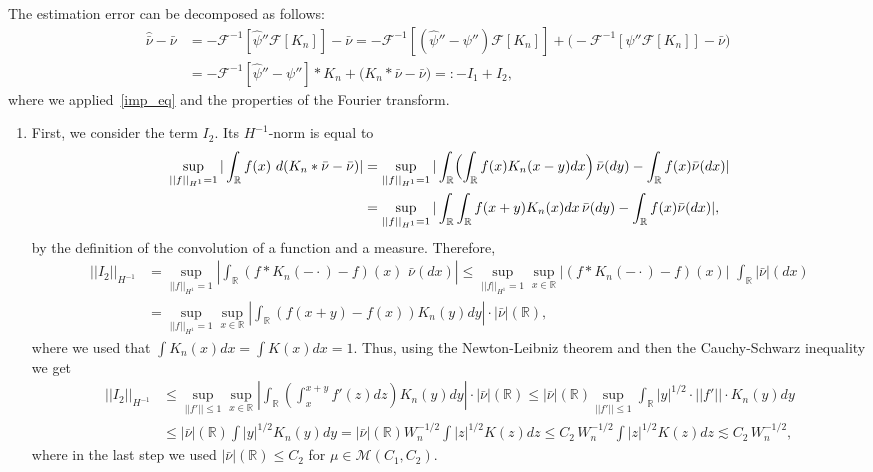 \documentclass[numbers,webpdf,imaiai]{ima-authoring-template}%
\theoremstyle{thmstyletwo}%
\newcommand{\R}{\mathbb{R}}
\newcommand{\F}{\mathcal{F}}
\numberwithin{equation}{section}
\begin{document}
The estimation error can be decomposed as follows: \begin{align*}
    \widehat{\bar{\nu}} - \bar{\nu} &= -\F^{-1}[\widehat{\psi}''\F[K_n]] - \bar{\nu} = -\F^{-1}[(\widehat{\psi}'' - \psi'')\F[K_n]] + \bigl( - \F^{-1}[\psi''\F[K_n]]   - \bar{\nu} \bigr)\\
        &= -\F^{-1}[\widehat{\psi}'' - \psi''] * K_n + \bigl(  K_n * \bar{\nu}   - \bar{\nu} \bigr)=: -I_1+ I_2,
\end{align*}
where we applied~\eqref{imp_eq} and the properties of the Fourier transform.
\begin{enumerate}
\item First, we consider the term $I_2$.  Its \(H^{-1}\)-norm is equal to 
    \begin{align*}
        \sup_{||f||_{H^1} =1} |\int_{\R} f(x) \,\, d(K_n * \bar{\nu} - \bar{\nu})| &= \sup_{||f||_{H^1} =1} |\int_{\R} \Bigl(\int_{\R} f(x) K_n(x-y) dx \Bigr)\, \bar{\nu}(dy) - \int_{\R} f(x) \bar{\nu}(dx)| \\
         &= \sup_{||f||_{H^1} =1} |\int_{\R}\int_{\R} f(x+y) K_n(x) dx \, \bar{\nu}(dy) - \int_{\R} f(x) \bar{\nu}(dx)|,
        \end{align*}
by the definition of the convolution of a function and a measure. Therefore, 
    \begin{align*}
        ||I_2||_{H^{-1}} &= \sup_{||f||_{H^1} =1} |\int_{\R} (f * K_n(-\cdot) - f)(x) \,\, \bar{\nu}(dx)| \leq \sup_{||f||_{H^1} =1} \sup_{x\in \R} |(f * K_n(-\cdot) - f)(x)| \,\, \int_{\R} |\bar{\nu}|(dx) \\
    &= \sup_{||f||_{H^1} =1} \sup_{x\in \R} |\int_{\R} (f(x + y) - f(x)) K_n(y)dy|\cdot |\bar{\nu}|(\R),
    \end{align*}
where we used that $\int K_n(x)dx =\int K(x)dx = 1$. Thus, using the Newton-Leibniz theorem and then the Cauchy-Schwarz inequality we get
    \begin{align*}
     ||I_2||_{H^{-1}} &\leq \sup_{||f'|| \leq 1} \sup_{x\in \R} |\int_{\R} (\int_x^{x+y} f'(z) dz)K_n(y)dy|\cdot |\bar{\nu}|(\R) \leq |\bar{\nu}|(\R) \sup_{||f'|| \leq 1} \int_{\R} |y|^{1/2} \cdot ||f'|| \cdot K_n(y)dy \\ 
    &\leq |\bar{\nu}|(\R)\int |y|^{1/2} K_n(y) dy
    = 
    |\bar{\nu}|(\R) W_n^{-1/2}\int  |z|^{1/2} K(z) dz\leq C_2\, W_n^{-1/2}\int  |z|^{1/2} K(z) dz \lesssim C_2\, W_n^{-1/2},
\end{align*}
where in the last step we used $|\bar\nu|(\R)\leq C_2$ for $\mu\in\mathcal{M}(C_1,C_2)$.


\end{enumerate}
\end{document}
